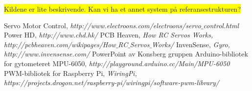 \colorbox{yellow}{Kildene er lite beskrivende. Kan vi ha et annet system på referansestrukturen?}
\begin{thebibliography}{9}

 \label{ref:PWM} Servo Motor Control, \emph{http://www.electroons.com/electroons/servo$\_$control.html}
 \label{ref:PowerHD} 
Power HD, \emph{http://www.chd.hk/}
 \label{ref:SerCtrl} PCB Heaven, \emph{How RC Servos Works, http://pcbheaven.com/wikipages/How$\_$RC$\_$Servos$\_$Works/}
 \label{ref:InSens} InvenSense, \emph{Gyro, http://www.invensense.com/}
 \label{ref:PowerPoint} PowerPoint av Konsberg gruppen
 \label{ref:SerCtrl} Arduino-bibliotek for gytometeret MPU-6050, \emph{http://playground.arduino.cc/Main/MPU-6050}
 \label{ref:SerCtrl} PWM-bibliotek for Raspberry Pi, \emph{WiringPi, https://projects.drogon.net/raspberry-pi/wiringpi/software-pwm-library/}

\end{thebibliography}
